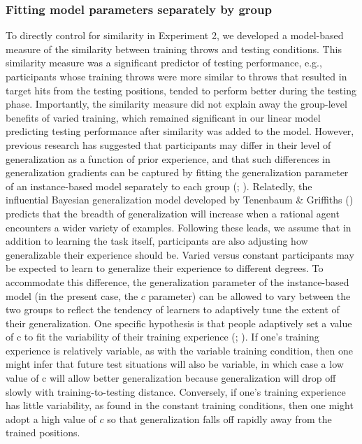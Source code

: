 \documentclass[
  11pt,
  letterpaper,
]{article}
\begin{document}
\subsubsection{Fitting model parameters separately by
group}\label{fitting-model-parameters-separately-by-group}

To directly control for similarity in Experiment 2, we developed a
model-based measure of the similarity between training throws and
testing conditions. This similarity measure was a significant predictor
of testing performance, e.g., participants whose training throws were
more similar to throws that resulted in target hits from the testing
positions, tended to perform better during the testing phase.
Importantly, the similarity measure did not explain away the group-level
benefits of varied training, which remained significant in our linear
model predicting testing performance after similarity was added to the
model. However, previous research has suggested that participants may
differ in their level of generalization as a function of prior
experience, and that such differences in generalization gradients can be
captured by fitting the generalization parameter of an instance-based
model separately to each group
(;
).
Relatedly, the influential Bayesian generalization model developed by
Tenenbaum \& Griffiths
()
predicts that the breadth of generalization will increase when a
rational agent encounters a wider variety of examples. Following these
leads, we assume that in addition to learning the task itself,
participants are also adjusting how generalizable their experience
should be. Varied versus constant participants may be expected to learn
to generalize their experience to different degrees. To accommodate this
difference, the generalization parameter of the instance-based model (in
the present case, the \(c\) parameter) can be allowed to vary between
the two groups to reflect the tendency of learners to adaptively tune
the extent of their generalization. One specific hypothesis is that
people adaptively set a value of c to fit the variability of their
training experience
(;
). If one's training experience is relatively variable, as with the
variable training condition, then one might infer that future test
situations will also be variable, in which case a low value of c will
allow better generalization because generalization will drop off slowly
with training-to-testing distance. Conversely, if one's training
experience has little variability, as found in the constant training
conditions, then one might adopt a high value of \(c\) so that
generalization falls off rapidly away from the trained positions.
\end{document}
